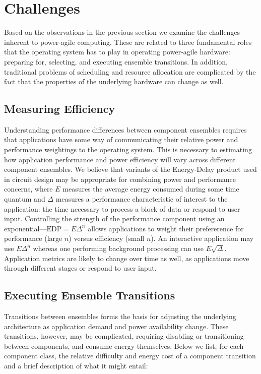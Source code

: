 \section{Challenges}

Based on the observations in the previous section we examine the challenges
inherent to power-agile computing. These are related to three fundamental
roles that the operating system has to play in operating power-agile
hardware: preparing for, selecting, and executing ensemble transitions. In
addition, traditional problems of scheduling and resource allocation are
complicated by the fact that the properties of the underlying hardware can
change as well.

\subsection{Measuring Efficiency}

Understanding performance differences between component ensembles requires
that applications have some way of communicating their relative power and
performance weightings to the operating system. This is necessary to
estimating how application performance and power efficiency will vary across
different component ensembles. We believe that variants of the Energy-Delay
product used in circuit design may be appropriate for combining power and
performance concerns, where $E$ measures the average energy consumed during
some time quantum and $\Delta$ measures a performance characteristic of
interest to the application: the time necessary to process a block of data or
respond to user input. Controlling the strength of the performance component
using an exponential---$\textrm{EDP} = E\Delta^n$ allows applications to
weight their prefererence for performance (large $n$) versus efficiency
(small $n$). An interactive application may use $E\Delta^n$ whereas one
performing background processing can use $E\sqrt{\Delta}$. Application
metrics are likely to change over time as well, as applications move through
different stages or respond to user input.

\subsection{Executing Ensemble Transitions}

Transitions between ensembles forms the basis for adjusting the underlying
architecture as application demand and power availability change. These
transitions, however, may be complicated, requiring disabling or
transitioning between components, and consume energy themselves. Below we
list, for each component class, the relative difficulty and energy cost of a
component transition and a brief description of what it might entail:


